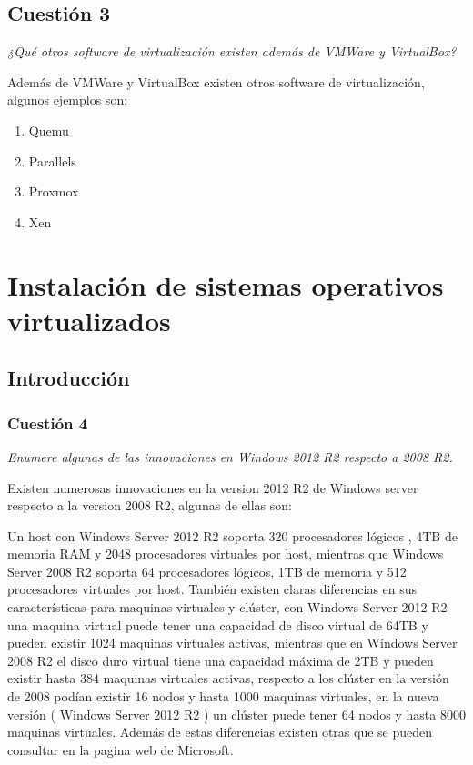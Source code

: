 \subsection{Cuestión 3}

\textit{¿Qué otros software de virtualización existen además de VMWare y VirtualBox?} \newline

Además de  VMWare y VirtualBox existen otros software de virtualización, algunos ejemplos son:
\begin{enumerate}
    \item Quemu \cite{quemu}
    \item Parallels \cite{parallels}
    \item Proxmox \cite{proxmox}
    \item Xen \cite{xen}
\end{enumerate}

\section{Instalación de sistemas operativos virtualizados}
\subsection{Introducción}
\subsubsection{Cuestión 4}
\textit{Enumere algunas de las innovaciones en Windows 2012 R2 respecto a 2008 R2.} \newline

Existen numerosas innovaciones en la version 2012 R2 de Windows server respecto a la version 2008 R2, algunas de ellas son:

Un host con Windows Server 2012 R2 soporta 320 procesadores lógicos , 4TB de memoria RAM y 2048 procesadores virtuales por host, mientras que Windows Server 2008 R2 soporta 64 procesadores lógicos, 1TB de memoria y 512 procesadores virtuales por host. También existen claras diferencias en sus características para maquinas virtuales y clúster, con Windows Server 2012 R2 una maquina virtual puede tener una capacidad de disco virtual de 64TB y pueden existir 1024 maquinas virtuales activas, mientras que en Windows Server 2008 R2 el disco duro virtual tiene una capacidad máxima de 2TB y pueden existir hasta 384 maquinas virtuales activas, respecto a los clúster en la versión de 2008 podían existir 16 nodos y hasta 1000 maquinas virtuales, en la nueva versión ( Windows Server 2012 R2 ) un clúster puede tener 64 nodos y hasta 8000 maquinas virtuales. Además de estas diferencias existen otras que se pueden consultar en la pagina web de Microsoft. \cite{2008vs2012}



